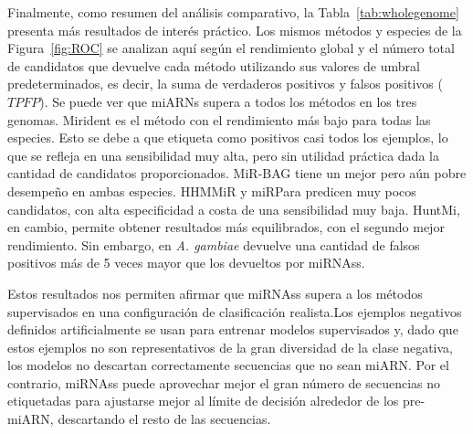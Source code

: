 Finalmente, como resumen del análisis comparativo, la Tabla~\ref{tab:wholegenome} presenta más resultados de interés práctico. Los mismos métodos y
especies de la Figura~\ref{fig:ROC} se analizan aquí según el rendimiento global y el número total de candidatos que devuelve cada método utilizando sus
valores de umbral predeterminados, es decir, la suma de verdaderos positivos y falsos positivos ( $TPFP$). Se puede ver que miARNs supera a todos los métodos
en los tres genomas. Mirident es el método con el rendimiento más bajo para todas las especies. Esto se debe a que etiqueta como positivos casi todos los
ejemplos, lo que se refleja en una sensibilidad muy alta, pero sin utilidad práctica dada la cantidad de candidatos proporcionados. MiR-BAG tiene un mejor
pero aún pobre desempeño en ambas especies. HHMMiR y miRPara predicen muy pocos candidatos, con alta especificidad a costa de una sensibilidad muy baja.
HuntMi, en cambio, permite obtener resultados más equilibrados, con el segundo mejor rendimiento. Sin embargo, en \textit{A. gambiae} devuelve una cantidad de
falsos positivos más de 5 veces mayor que los devueltos por miRNAss.

Estos resultados nos permiten afirmar que miRNAss supera a los métodos supervisados en una configuración de clasificación realista.Los ejemplos
negativos definidos artificialmente se usan para entrenar modelos supervisados y, dado que estos ejemplos no son representativos de la gran diversidad de
la clase negativa, los modelos no descartan correctamente secuencias que no sean miARN. Por el contrario, miRNAss puede aprovechar mejor el gran número de
secuencias no etiquetadas para ajustarse mejor al límite de decisión alrededor de los pre-miARN, descartando el resto de las secuencias.


